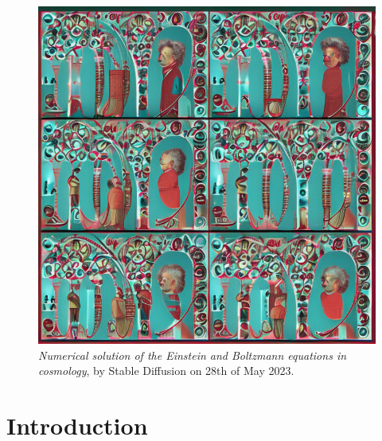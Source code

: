 \documentclass[10pt,a4paper]{article}
\begin{document}
\clearpage

\setcounter{figure}{-1}
\begin{figure}
\centering
\includegraphics[width=1.0\textwidth]{../masterpiece4-by-stable-diffusion.png}
\caption{
\textit{Numerical solution of the Einstein and Boltzmann equations in cosmology},
by Stable Diffusion on 28th of May 2023.
}
\end{figure}

\clearpage

\setcounter{section}{-1}
\section{Introduction}
\label{sec_intro}
\end{document}
